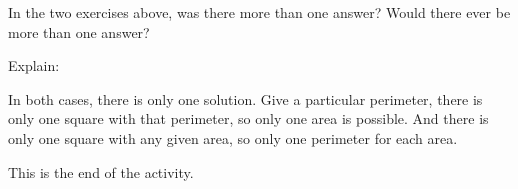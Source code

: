 \documentclass{ximera}
\begin{document}
\begin{exercise}
In the two exercises above, was there more than one answer?  Would there ever be more than one answer? 

\begin{multipleChoice}
\end{multipleChoice}

Explain:
\begin{freeResponse}
In both cases, there is only one solution.  Give a particular perimeter, there is only one square with that perimeter, so only one area is possible.  And there is only one square with any given area, so only one perimeter for each area.
\end{freeResponse}

\end{exercise}

This is the end of the activity.
\end{document}
